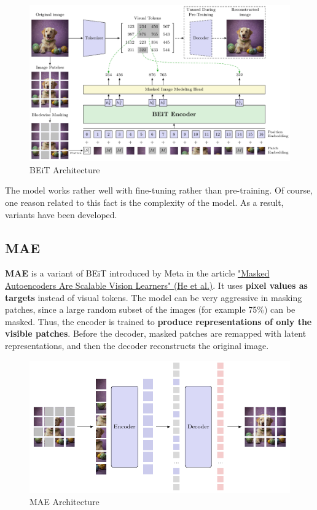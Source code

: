 \begin{figure}[!htbp]
    \centering
    \includegraphics[width=\linewidth]{tikz/chapter11 - BEiT.pdf}
    \caption{BEiT Architecture}
\end{figure}

The model works rather well with fine-tuning rather than pre-training. Of course, one reason related to this fact is the complexity of the model. As a result, variants have been developed.

\subsection{MAE}

\textbf{MAE} is a variant of BEiT introduced by Meta in the article \href{https://arxiv.org/pdf/2111.06377}{"Masked Autoencoders Are Scalable Vision Learners" (He et al.)}. It uses \textbf{pixel values as targets} instead of visual tokens. The model can be very aggressive in masking patches, since a large random subset of the images (for example 75\%) can be masked. Thus, the encoder is trained to \textbf{produce representations of only the visible patches}. Before the decoder, masked patches are remapped with latent representations, and then the decoder reconstructs the original image.

\begin{figure}[!htbp]
    \centering
    \includegraphics[width=\linewidth]{tikz/chapter11 - MAE.pdf}
    \caption{MAE Architecture}
\end{figure}


